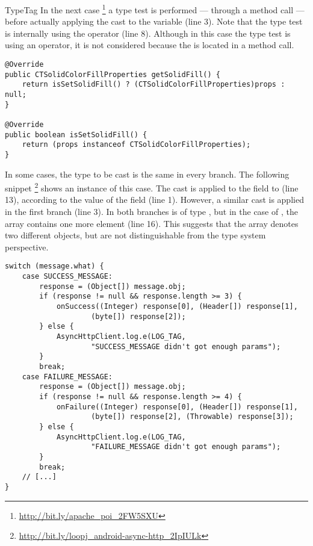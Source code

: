 \begin{pattern}{TypeTag}
%
In the next case%
\footnote{\url{http://bit.ly/apache_poi_2FW5SXU}}
a type test is performed --- through a method call --- before actually applying the cast to the variable  (line 3).
Note that the type test is internally using the  operator (line 8).
Although in this case the type test is using an  operator,
it is not considered  because the  is located in a method call.

\begin{verbatim}
@Override
public CTSolidColorFillProperties getSolidFill() {
    return isSetSolidFill() ? (CTSolidColorFillProperties)props : null;
}

@Override
public boolean isSetSolidFill() {
    return (props instanceof CTSolidColorFillProperties);
}
\end{verbatim}

In some cases, the type to be cast is the same in every branch.
The following snippet%
\footnote{\url{http://bit.ly/loopj_android-async-http_2IpIULk}}
shows an instance of this case.
The cast is applied to the  field to (line 13),
according to the value of the  field (line 1).
However, a similar cast is applied in the first branch (line 3).
In both branches  is of type ,
but in the case of ,
the array contains one more element (line 16).
This suggests that the  array denotes two different objects,
but are not distinguishable from the type system perspective.

\begin{verbatim}
switch (message.what) {
    case SUCCESS_MESSAGE:
        response = (Object[]) message.obj;
        if (response != null && response.length >= 3) {
            onSuccess((Integer) response[0], (Header[]) response[1],
                    (byte[]) response[2]);
        } else {
            AsyncHttpClient.log.e(LOG_TAG, 
                    "SUCCESS_MESSAGE didn't got enough params");
        }
        break;
    case FAILURE_MESSAGE:
        response = (Object[]) message.obj;
        if (response != null && response.length >= 4) {
            onFailure((Integer) response[0], (Header[]) response[1],
                    (byte[]) response[2], (Throwable) response[3]);
        } else {
            AsyncHttpClient.log.e(LOG_TAG,
                    "FAILURE_MESSAGE didn't got enough params");
        }
        break;
    // [...]
}
\end{verbatim}


\end{pattern}
